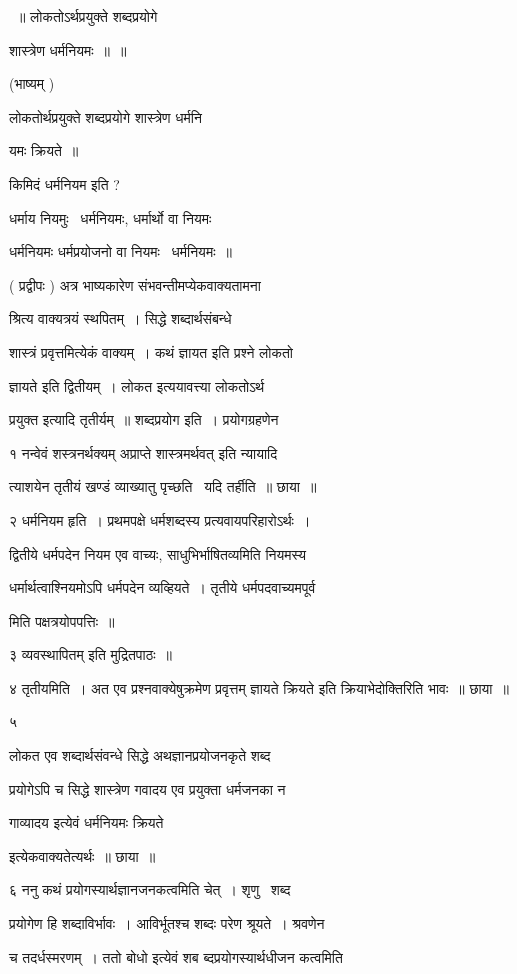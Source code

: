 \documentclass[11pt, openany]{book}
\begin{document}
~॥ लोकतोऽर्थप्रयुक्ते शब्दप्रयोगे 

शास्त्रेण धर्मनियमः~॥~॥ 

(भाष्यम् ) 

लोकतोर्थप्रयुक्ते शब्दप्रयोगे शास्त्रेण धर्मनि \textendash\ 

यमः क्रियते~॥ 

किमिदं धर्मनियम इति ? 

धर्माय नियमुः \textendash\ धर्मनियमः, धर्मार्थो वा नियमः \textendash\ 

धर्मनियमः धर्मप्रयोजनो वा नियमः \textendash\ धर्मनियमः~॥ 

( प्रद्वीपः ) अत्र भाष्यकारेण संभवन्तीमप्येकवाक्यतामना \textendash\ 

श्रित्य वाक्यत्रयं स्थपितम्~। सिद्धे शब्दार्थसंबन्धे 

शास्त्रं प्रवृत्तमित्येकं वाक्यम्~। कथं ज्ञायत इति प्रश्ने लोकतो 

ज्ञायते इति द्वितीयम्~। लोकत इत्ययावत्त्या लोकतोऽर्थ \textendash\ 

प्रयुक्त इत्यादि तृतीर्यम्~॥ शब्दप्रयोग इति~। प्रयोगग्रहणेन 

१ नन्वेवं शस्त्रनर्थक्यम् {\qt अप्राप्ते शास्त्रमर्थवत्} इति न्यायादि \textendash\ 

त्याशयेन तृतीयं खण्डं व्याख्यातु पृच्छति \textendash\ यदि तर्हीति~॥ छाया~॥ 

२ धर्मनियम हृति~। प्रथमपक्षे धर्मशब्दस्य प्रत्यवायपरिहारोऽर्थः~। 

द्वितीये धर्मपदेन नियम एव वाच्यः, साधुभिर्भाषितव्यमिति नियमस्य 

धर्मार्थत्वाश्नियमोऽपि धर्मपदेन व्यव्हियते~। तृतीये धर्मपदवाच्यमपूर्व \textendash\ 


मिति पक्षत्रयोपपत्तिः~॥ 

३ {\qt व्यवस्थापितम्} इति मुद्रितपाठः~॥ 

४ तृतीयमिति~। अत एव प्रश्नवाक्येषुक्रमेण {\qt प्रवृत्तम् ज्ञायते क्रियते} इति क्रियाभेदोक्तिरिति भावः~॥ छाया~॥ 

५ {\qt लोकत एव शब्दार्थसंवन्धे सिद्धे अथज्ञानप्रयोजनकृते शब्द \textendash\ 

प्रयोगेऽपि च सिद्धे शास्त्रेण गवादय एव प्रयुक्ता धर्मजनका न 

गाव्यादय इत्येवं धर्मनियमः क्रियते} इत्येकवाक्यतेत्यर्थः~॥ छाया~॥ 

६ ननु कथं प्रयोगस्यार्थज्ञानजनकत्वमिति चेत्~। शृणु \textendash\ शब्द \textendash\ 

प्रयोगेण हि शब्दाविर्भावः~। आविर्भूतश्च शब्दः परेण श्रूयते~। श्रवणेन 

च तदर्धस्मरणम्~। ततो बोधो इत्येवं शब ब्दप्रयोगस्यार्थधीजन कत्वमिति 
\end{document}
